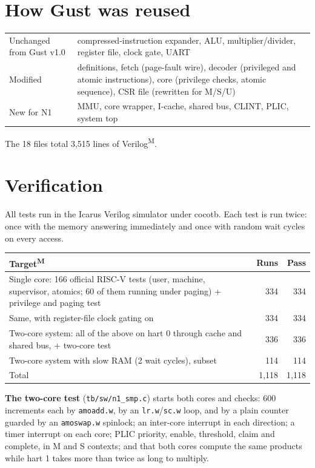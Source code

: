 \documentclass[10pt,a4paper]{article}
\newcommand{\code}[1]{\texttt{#1}}
\newcommand{\meas}{\textsuperscript{M}}
\newcommand{\regcore}{334}
\newcommand{\regcg}{334}
\newcommand{\regsoc}{336}
\newcommand{\reglat}{114}
\newcommand{\regtotal}{1{,}118}
\newcommand{\rtllines}{3{,}515}
\begin{document}
\section{How Gust was reused}\label{sec:reuse}
\begin{center}\small
\begin{tabularx}{\linewidth}{@{}lX@{}}
\toprule
Unchanged from Gust v1.0 & compressed-instruction expander, ALU, multiplier/divider, register file, clock gate, UART\\
Modified & definitions, fetch (page-fault wire), decoder (privileged and atomic instructions), core (privilege checks, atomic sequence), CSR file (rewritten for M/S/U)\\
New for N1 & MMU, core wrapper, I-cache, shared bus, CLINT, PLIC, system top\\
\bottomrule
\end{tabularx}
\end{center}
The 18 files total \rtllines{} lines of Verilog\meas.

\section{Verification}\label{sec:verif}
All tests run in the Icarus Verilog simulator under cocotb. Each test is run twice: once with the
memory answering immediately and once with random wait cycles on every access.

\begin{center}\small
\begin{tabularx}{\linewidth}{@{}Xrr@{}}
\toprule
Target\meas & Runs & Pass\\
\midrule
Single core: 166 official RISC-V tests (user, machine, supervisor, atomics; 60 of them running under paging) + privilege and paging test & \regcore & \regcore\\
Same, with register-file clock gating on & \regcg & \regcg\\
Two-core system: all of the above on hart 0 through cache and shared bus, + two-core test & \regsoc & \regsoc\\
Two-core system with slow RAM (2 wait cycles), subset & \reglat & \reglat\\
\midrule
Total & \regtotal & \regtotal\\
\bottomrule
\end{tabularx}
\end{center}

\textbf{The two-core test} (\code{tb/sw/n1\_smp.c}) starts both cores and checks: 600 increments each by
\code{amoadd.w}, by an \code{lr.w}/\code{sc.w} loop, and by a plain counter guarded by an
\code{amoswap.w} spinlock; an inter-core interrupt in each direction; a timer interrupt on each core;
PLIC priority, enable, threshold, claim and complete, in M and S contexts; and that both cores compute
the same products while hart 1 takes more than twice as long to multiply.
\end{document}
